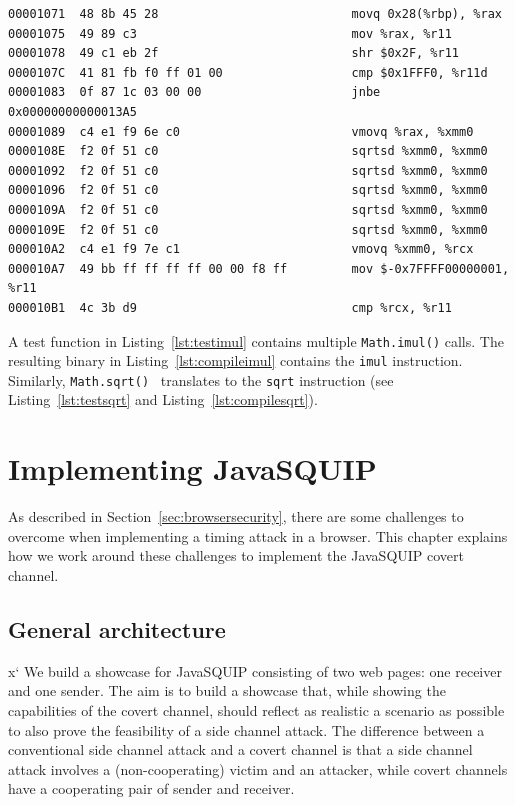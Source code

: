 \documentclass[11pt,
  titlepage=false,
  parskip=half,      %
]{scrreprt}
\begin{document}
\begin{lstlisting}[float,caption={The compiled result of the \texttt{sqrt} test function},label={lst:compilesqrt}]
00001071  48 8b 45 28                           movq 0x28(%rbp), %rax
00001075  49 89 c3                              mov %rax, %r11
00001078  49 c1 eb 2f                           shr $0x2F, %r11
0000107C  41 81 fb f0 ff 01 00                  cmp $0x1FFF0, %r11d
00001083  0f 87 1c 03 00 00                     jnbe 0x00000000000013A5
00001089  c4 e1 f9 6e c0                        vmovq %rax, %xmm0
0000108E  f2 0f 51 c0                           sqrtsd %xmm0, %xmm0
00001092  f2 0f 51 c0                           sqrtsd %xmm0, %xmm0
00001096  f2 0f 51 c0                           sqrtsd %xmm0, %xmm0
0000109A  f2 0f 51 c0                           sqrtsd %xmm0, %xmm0
0000109E  f2 0f 51 c0                           sqrtsd %xmm0, %xmm0
000010A2  c4 e1 f9 7e c1                        vmovq %xmm0, %rcx
000010A7  49 bb ff ff ff ff 00 00 f8 ff         mov $-0x7FFFF00000001, %r11
000010B1  4c 3b d9                              cmp %rcx, %r11
\end{lstlisting}

A test function in Listing~\ref{lst:testimul} contains multiple \texttt{Math.imul()} calls.
The resulting binary in Listing~\ref{lst:compileimul} contains the \texttt{imul} instruction.
Similarly, \texttt{Math.sqrt()}~\cite{mathsqrt} translates to the \texttt{sqrt} instruction (see Listing~\ref{lst:testsqrt} and Listing~\ref{lst:compilesqrt}).

\chapter{Implementing JavaSQUIP}
\label{ch:implementation}
As described in Section~\ref{sec:browsersecurity}, there are some challenges to overcome when implementing a timing attack in a browser.
This chapter explains how we work around these challenges to implement the JavaSQUIP covert channel.

\section{General architecture}
\label{sec:general-architecture}x`
We build a showcase for JavaSQUIP consisting of two web pages: one receiver and one sender.
The aim is to build a showcase that, while showing the capabilities of the covert channel,
should reflect as realistic a scenario as possible to also prove the feasibility of a side channel attack.
The difference between a conventional side channel attack and a covert channel is that a side channel attack involves a (non-cooperating) victim and
an attacker, while covert channels have a cooperating pair of sender and receiver.
\end{document}
